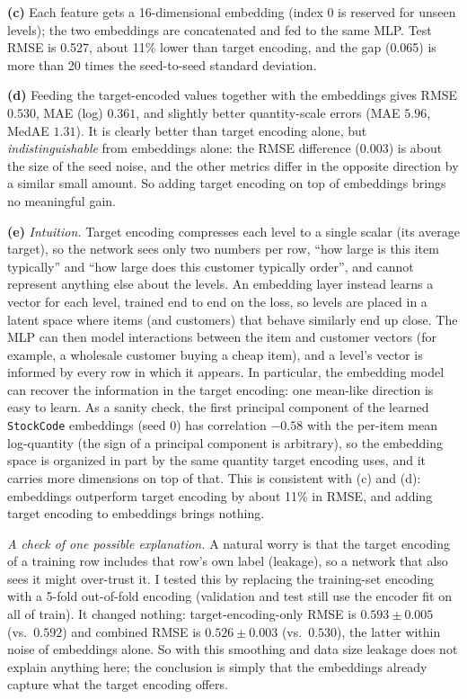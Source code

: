 \documentclass{article}
\newcounter{example}[section]
\newcounter{code}[section]
\begin{document}
\begin{solution}[]
  \textbf{(c)} Each feature gets a 16-dimensional embedding (index 0 is reserved for unseen levels); the two embeddings are concatenated and fed to the same MLP. Test RMSE is 0.527, about 11\% lower than target encoding, and the gap (0.065) is more than 20 times the seed-to-seed standard deviation.

  \textbf{(d)} Feeding the target-encoded values together with the embeddings gives RMSE $0.530$, MAE (log) $0.361$, and slightly better quantity-scale errors (MAE $5.96$, MedAE $1.31$). It is clearly better than target encoding alone, but \emph{indistinguishable} from embeddings alone: the RMSE difference ($0.003$) is about the size of the seed noise, and the other metrics differ in the opposite direction by a similar small amount. So adding target encoding on top of embeddings brings no meaningful gain.

  \textbf{(e)} \emph{Intuition.} Target encoding compresses each level to a single scalar (its average target), so the network sees only two numbers per row, ``how large is this item typically'' and ``how large does this customer typically order'', and cannot represent anything else about the levels. An embedding layer instead learns a vector for each level, trained end to end on the loss, so levels are placed in a latent space where items (and customers) that behave similarly end up close. The MLP can then model interactions between the item and customer vectors (for example, a wholesale customer buying a cheap item), and a level's vector is informed by every row in which it appears. In particular, the embedding model can recover the information in the target encoding: one mean-like direction is easy to learn. As a sanity check, the first principal component of the learned \texttt{StockCode} embeddings (seed 0) has correlation $-0.58$ with the per-item mean log-quantity (the sign of a principal component is arbitrary), so the embedding space is organized in part by the same quantity target encoding uses, and it carries more dimensions on top of that. This is consistent with (c) and (d): embeddings outperform target encoding by about 11\% in RMSE, and adding target encoding to embeddings brings nothing.

  \emph{A check of one possible explanation.} A natural worry is that the target encoding of a training row includes that row's own label (leakage), so a network that also sees it might over-trust it. I tested this by replacing the training-set encoding with a 5-fold out-of-fold encoding (validation and test still use the encoder fit on all of train). It changed nothing: target-encoding-only RMSE is $0.593\pm0.005$ (vs.\ $0.592$) and combined RMSE is $0.526\pm0.003$ (vs.\ $0.530$), the latter within noise of embeddings alone. So with this smoothing and data size leakage does not explain anything here; the conclusion is simply that the embeddings already capture what the target encoding offers.


\end{solution}
\end{document}
